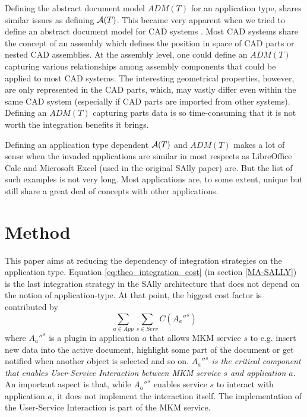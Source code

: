 \documentclass{llncs}
\begin{document}
Defining the abstract document model $ADM(T)$ for an application type, shares similar issues as defining $\mathcal{A}(T)$. This became very apparent when we tried to define an abstract document model for CAD systems \cite{KohlhaseEtAl:FullSemanticTransparency:2013}. Most CAD systems share the concept of an assembly which defines the position in space of CAD parts or nested CAD assemblies. At the assembly level, one could define an $ADM(T)$ capturing various relationships among assembly components that could be applied to most CAD systems. The interesting geometrical properties, however, are only represented in the CAD parts, which, may vastly differ even within the same CAD system (especially if CAD parts are imported from other systems). Defining an $ADM(T)$ capturing parts data is so time-consuming that it is not worth the integration benefits it brings.

Defining an application type dependent $\mathcal{A}(T)$ and $ADM(T)$ makes a lot of sense when the invaded applications are similar in most respects as LibreOffice Calc and Microsoft Excel (used in the original SAlly paper) are. But the list of such examples is not very long. Most applications are, to some extent, unique but still share a great deal of concepts with other applications. 

\section{Method}
\label{method}

This paper aims at reducing the dependency of integration strategies on the application type. Equation \ref{eq:theo_integration_cost} (in section \ref{MA-SALLY}) is the last integration strategy in the SAlly architecture that does not depend on the notion of application-type. At that point, the biggest cost factor is contributed by
\begin{equation}
\sum_{a\in App} \sum_{s \in Serv} C(A_a''^s)
\label{eq:cost_usi_req}
\end{equation}
where $A_a''^s$ is a plugin in application $a$ that allows MKM service $s$ to e.g. insert new data into the active document, highlight some part of the document or get notified when another object is selected and so on. \textit{$A_a''^s$ is the critical component that enables User-Service Interaction between MKM service $s$ and application $a$}. An important aspect is that, while $A_a''^s$ enables service $s$ to interact with application $a$, it does not implement the interaction itself. The implementation of the User-Service Interaction is part of the MKM service.
\end{document}
